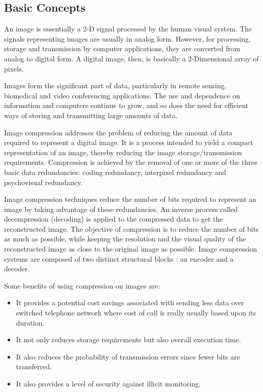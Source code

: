 \subsection{Basic Concepts}
An image is essentially a 2-D signal processed by the human visual system. The signals representing images are usually in analog form. However, for processing, storage and transmission by computer applications, they are converted from analog to digital form. A digital image, then, is basically a 2-Dimensional array of pixels.

Images form the significant part of data, particularly in remote sensing, biomedical and video conferencing applications. The use and dependence on information and computers continue to grow, and so does the need for efficient ways of storing and transmitting large amounts of data.

Image compression addresses the problem of reducing the amount of data required to represent a digital image. It is a process intended to yield a compact representation of an image, thereby reducing the image storage/transmission requirements. Compression is achieved by the removal of one or more of the three basic data redundancies: coding redundancy, interpixel redundancy and psychovisual redundancy\cite{Kumar:2007}.

Image compression techniques reduce the number of bits required to represent an image by taking advantage of these redundancies. An inverse process called decompression (decoding) is applied to the compressed data to get the reconstructed image. The objective of compression is to reduce the number of bits as much as possible, while keeping the resolution and the visual quality of the reconstructed image as close to the original image as possible. Image compression systems are composed of two distinct structural blocks : an encoder and a decoder.

Some benefits of using compression on images are:
\begin{itemize}
\item It provides a potential cost savings associated with sending less data over switched telephone network
where cost of call is really usually based upon its duration.
\item It not only reduces storage requirements but also overall execution time.
\item It also reduces the probability of transmission errors since fewer bits are transferred.
\item It also provides a level of security against illicit monitoring.
\end{itemize}

